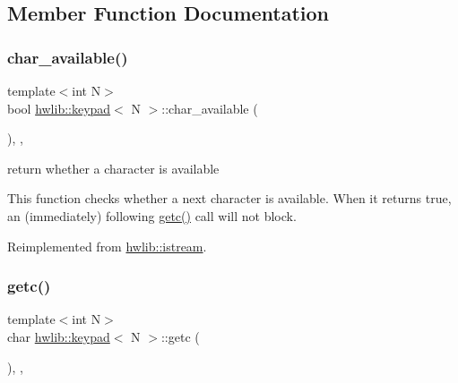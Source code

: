 \subsection{Member Function Documentation}
\mbox{\label{classhwlib_1_1keypad_a9bef86eba2e6ac84c014a1577f44cd9c}} 
\subsubsection{\texorpdfstring{char\+\_\+available()}{char\_available()}}
{\footnotesize\ttfamily template$<$int N$>$ \\
bool \hyperlink{classhwlib_1_1keypad}{hwlib\+::keypad}$<$ N $>$\+::char\+\_\+available (\begin{DoxyParamCaption}{ }\end{DoxyParamCaption})\hspace{0.3cm}{\ttfamily [inline]}, {\ttfamily [override]}, {\ttfamily [virtual]}}



return whether a character is available 

This function checks whether a next character is available. When it returns true, an (immediately) following \hyperlink{classhwlib_1_1keypad_aa2a2ab2fca1de5daa5587b3433c8e74a}{getc()} call will not block. 

Reimplemented from \hyperlink{classhwlib_1_1istream_a77c1ce784f42922cd4758f2d8a6c59b3}{hwlib\+::istream}.

\mbox{\label{classhwlib_1_1keypad_aa2a2ab2fca1de5daa5587b3433c8e74a}} 
\subsubsection{\texorpdfstring{getc()}{getc()}}
{\footnotesize\ttfamily template$<$int N$>$ \\
char \hyperlink{classhwlib_1_1keypad}{hwlib\+::keypad}$<$ N $>$\+::getc (\begin{DoxyParamCaption}{ }\end{DoxyParamCaption})\hspace{0.3cm}{\ttfamily [inline]}, {\ttfamily [override]}, {\ttfamily [virtual]}}



